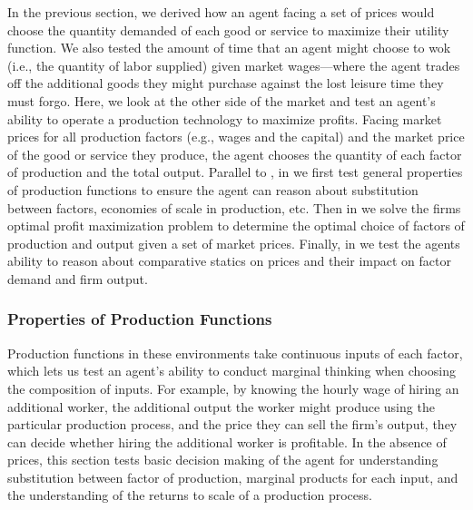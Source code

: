 In the previous section, we derived how an agent facing a set of prices would choose the quantity demanded of each good or service to maximize their utility function.  We also tested the amount of time that an agent might choose to wok (i.e., the quantity of labor supplied) given market wages---where the agent trades off the additional goods they might purchase against the lost leisure time they must forgo.  Here, we look at the other side of the market and test an agent's ability to operate a production technology to maximize profits.  Facing market prices for all production factors (e.g., wages and the capital) and the market price of the good or service they produce, the agent chooses the quantity of each factor of production and the total output.  Parallel to \fifthParent, in  we first test general properties of production functions to ensure the agent can reason about substitution between factors, economies of scale in production, etc.  Then in   we solve the firms optimal profit maximization problem to determine the optimal choice of factors of production and output given a set of market prices.  Finally, in  we test the agents ability to reason about comparative statics on prices and their impact on factor demand and firm output. 

\subsubsection{Properties of Production Functions}\label{mod:properties_production}
Production functions in these environments take continuous inputs of each factor, which lets us test an agent's ability to conduct marginal thinking when choosing the composition of inputs.  For example, by knowing the hourly wage of hiring an additional worker, the additional output the worker might produce using the particular production process, and the price they can sell the firm's output, they can decide whether hiring the additional worker is profitable.  In the absence of prices, this section tests basic decision making of the agent for understanding substitution between factor of production, marginal products for each input, and the understanding of the returns to scale of a production process.

